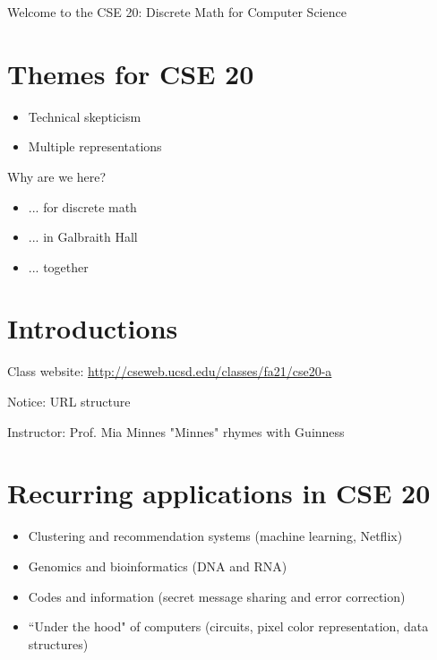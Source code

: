 

Welcome to the CSE 20: Discrete Math for Computer Science

\section*{Themes for CSE 20}
\begin{itemize}
\item Technical skepticism
\item Multiple representations
\end{itemize}

Why are we here?
\begin{itemize}
\item ... for discrete math
\item ... in Galbraith Hall
\item ... together
\end{itemize}

\section*{Introductions}
Class website: \href{http://cseweb.ucsd.edu/classes/fa21/cse20-a}{http://cseweb.ucsd.edu/classes/fa21/cse20-a}

Notice: URL structure

Instructor: Prof. Mia Minnes \tiny{"Minnes" rhymes with Guinness}


\section*{Recurring applications in CSE 20}
\begin{itemize}
\item Clustering and recommendation systems (machine learning, Netflix)
\item Genomics and bioinformatics (DNA and RNA)
\item Codes and information (secret message sharing and error correction)
\item ``Under the hood" of computers (circuits, pixel color representation, data structures)
\end{itemize}

